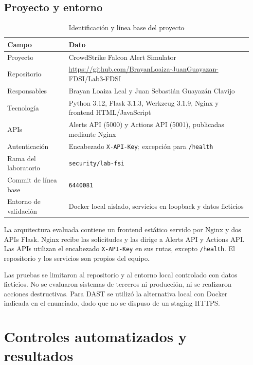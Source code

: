 \documentclass[journal]{IEEEtran}
\begin{document}
\subsection{Proyecto y entorno}
\begin{table}[H]
\centering
\caption{Identificación y línea base del proyecto}
\label{tab:baseline}
\begin{tabular}{|p{}|p{}|}\hline
\textbf{Campo} & \textbf{Dato} \\ \hline
Proyecto & CrowdStrike Falcon Alert Simulator \\ \hline
Repositorio & \url{https://github.com/BrayanLoaiza-JuanGuayazan-FDSI/Lab3-FDSI} \\ \hline
Responsables & Brayan Loaiza Leal y Juan Sebastián Guayazán Clavijo \\ \hline
Tecnología & Python 3.12, Flask 3.1.3, Werkzeug 3.1.9, Nginx y frontend HTML/JavaScript \\ \hline
APIs & Alerts API (5000) y Actions API (5001), publicadas mediante Nginx \\ \hline
Autenticación & Encabezado \texttt{X-API-Key}; excepción para \texttt{/health} \\ \hline
Rama del laboratorio & \texttt{security/lab-fsi} \\ \hline
Commit de línea base & \texttt{6440081} \\ \hline
Entorno de validación & Docker local aislado, servicios en loopback y datos ficticios \\ \hline
\end{tabular}
\end{table}

La arquitectura evaluada contiene un frontend estático servido por Nginx y dos APIs Flask. Nginx recibe las solicitudes y las dirige a Alerts API y Actions API. Las APIs utilizan el encabezado \texttt{X-API-Key} en sus rutas, excepto \texttt{/health}. El repositorio y los servicios son propios del equipo.

Las pruebas se limitaron al repositorio y al entorno local controlado con datos ficticios. No se evaluaron sistemas de terceros ni producción, ni se realizaron acciones destructivas. Para DAST se utilizó la alternativa local con Docker indicada en el enunciado, dado que no se dispuso de un staging HTTPS.

\section{Controles automatizados y resultados}
\end{document}
